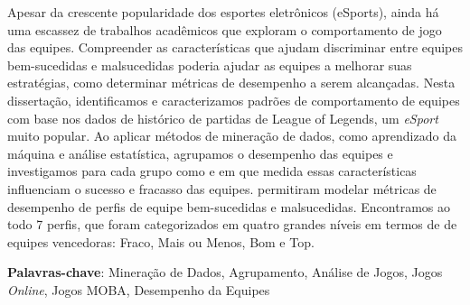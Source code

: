 Apesar da crescente popularidade dos esportes eletrônicos (eSports), ainda há uma escassez de trabalhos acadêmicos que exploram o comportamento de jogo das equipes. Compreender as características que ajudam discriminar entre equipes bem-sucedidas e malsucedidas poderia ajudar as equipes a melhorar suas estratégias, como determinar métricas de desempenho a serem alcançadas. Nesta dissertação, identificamos e caracterizamos padrões de comportamento de equipes com base nos dados de histórico de partidas de League of Legends, um \textit{eSport} muito popular. Ao aplicar métodos de mineração de dados, como aprendizado da máquina e análise estatística, agrupamos o desempenho das equipes e investigamos para cada grupo como e em que medida essas características influenciam o sucesso e fracasso das equipes.  permitiram modelar métricas de desempenho de perfis de equipe bem-sucedidas e malsucedidas. Encontramos ao todo 7  perfis, que foram categorizados em quatro grandes níveis em termos de  de equipes vencedoras: Fraco, Mais ou Menos, Bom e Top.

\textbf{Palavras-chave}: Mineração de Dados, Agrupamento, Análise de Jogos, Jogos \textit{Online}, Jogos MOBA, Desempenho da Equipes
